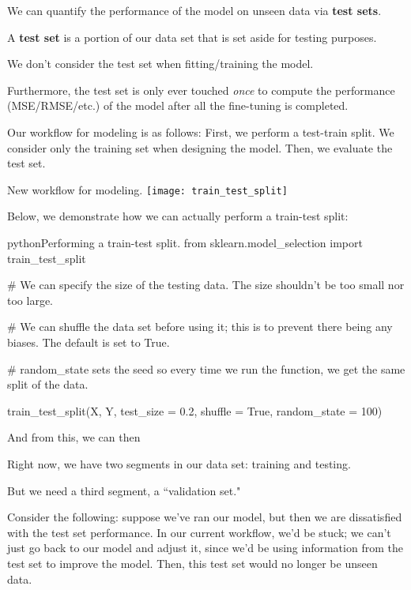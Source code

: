 \documentclass[openany]{book}
\begin{document}
We can quantify the performance of the model on unseen data via \textbf{test sets}.

\begin{defn}
	A \textbf{test set} is a portion of our data set that is set aside for testing purposes.
	
	We don't consider the test set when fitting/training the model.
	
	Furthermore, the test set is only ever touched \textit{once} to compute the performance (MSE/RMSE/etc.) of the model after all the fine-tuning is completed.
\end{defn}

Our workflow for modeling is as follows: First, we perform a test-train split. We consider only the training set when designing the model. Then, we evaluate the test set.

\begin{figurebox}[]{New workflow for modeling.}
	\centering\texttt{[image: train\_test\_split]}
\end{figurebox}

Below, we demonstrate how we can actually perform a train-test split:
\begin{code}{python}{Performing a train-test split.}
from sklearn.model_selection import train_test_split

# We can specify the size of the testing data. The size shouldn't be too small nor too large.

# We can shuffle the data set before using it; this is to prevent there being any biases. The default is set to True.

# random_state sets the seed so every time we run the function, we get the same split of the data.

train_test_split(X, Y, test_size = 0.2, shuffle = True, random_state = 100)
\end{code}

And from this, we can then 

Right now, we have two segments in our data set: training and testing.

But we need a third segment, a ``validation set."

Consider the following: suppose we've ran our model, but then we are dissatisfied with the test set performance. In our current workflow, we'd be stuck; we can't just go back to our model and adjust it, since we'd be using information from the test set to improve the model. Then, this test set would no longer be unseen data.
\end{document}
